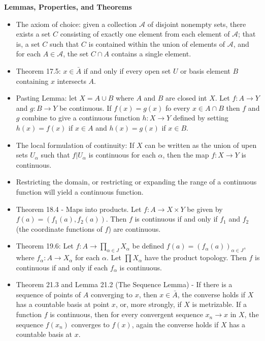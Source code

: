 \documentclass[12pt,letterpaper]{article}
\begin{document}
\textbf{Lemmas, Properties, and Theorems} \label{sec:Theorems}\
\begin{itemize}
    \item \label{thm:AxiomChoice} The axiom of choice: given a collection $\mathcal{A}$ of disjoint nonempty sets, there exists a set $C$ consisting of exactly one element from each element of $\mathcal{A}$; that is, a set $C$ such that $C$ is contained within the union of elements of $\mathcal{A}$, and for each $A\in\mathcal{A}$, the set $C\cap A$ contains a single element.
    \item \label{thm:BelongsClosure17.5} Theorem 17.5:  $x\in \bar{A}$ if and only if every open set $U$ or basis element $B$ containing $x$ intersects $A$.
    \item \label{thm:PastingLemma} Pasting Lemma: let $X=A\cup B$ where $A$ and $B$ are closed int $X$. Let $f: A\rightarrow Y$ and $g: B\rightarrow Y$ be continuous. If $f(x)=g(x)$ fo every $x\in A\cap B$ then $f$ and $g$ combine to give a continuous function $h: X\rightarrow Y$ defined by setting $h(x) = f(x)$ if $x\in A$ and $h(x) = g(x)$ if $x\in B$.
    \item \label{thm:LocalFormulationContinuity} The local formulation of continuity: If $X$ can be written as the union of upen sets $U_\alpha$ such that $f|U_\alpha$ is continuous for each $\alpha$, then the map $f: X\rightarrow Y$ is continuous.
    \item \label{thm:ChangingRangeDomainContinuity} Restricting the domain, or restricting or expanding the range of a continuous function will yield a continuous function.
    \item \label{thm:MapsProducts18.4} Theorem 18.4 - Maps into products. Let $f : A\rightarrow X\times Y$ be given by $f(a)=(f_1(a),f_2(a))$. Then $f$ is continuous if and only if $f_1$ and $f_2$ (the coordinate functions of $f$) are continuous.
    \item \label{thm:MapsProducts19.6} Theorem 19.6: Let $f: A \rightarrow \prod_{\alpha\in J}X_\alpha$ be defined $f(a) = (f_\alpha(a))_{\alpha \in J}$, where $f_\alpha : A \rightarrow X_\alpha$ for each $\alpha$. Let $\prod X_\alpha$ have the product topology. Then $f$ is continuous if and only if each $f_\alpha$ is continuous.
    \item \label{thm:SequenceContinuity21.3} Theorem 21.3 and Lemma 21.2 (The Sequence Lemma) - If there is a sequence of points of $A$ converging to $x$, then $x\in \bar{A}$, the converse holds if $X$ has a countable basis at point $x$, or, more strongly, if $X$ is metrizable. If a function $f$ is continuous, then for every convergent sequence $x_n\rightarrow x$ in $X$, the sequence $f(x_n)$ converges to $f(x)$, again the converse holds if $X$ has a countable basis at $x$. 
\end{itemize}
\end{document}
